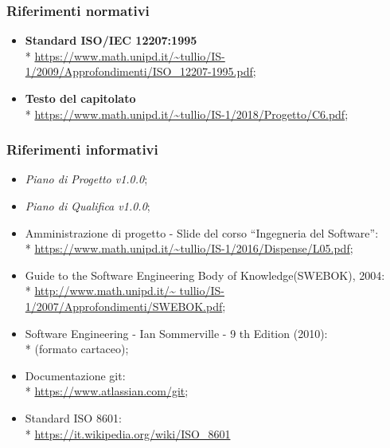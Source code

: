 \subsubsection{Riferimenti normativi}
\begin{itemize}
	\item \textbf{Standard ISO/IEC 12207:1995} \\* 
		\url{https://www.math.unipd.it/~tullio/IS-1/2009/Approfondimenti/ISO_12207-1995.pdf};
	\item \textbf{Testo del capitolato} \\*  
		\url{https://www.math.unipd.it/~tullio/IS-1/2018/Progetto/C6.pdf};
\end{itemize}

\subsubsection{Riferimenti informativi}
\begin{itemize}
	\item \textit{Piano di Progetto v1.0.0};
	\item \textit{Piano di Qualifica v1.0.0};
	\item Amministrazione di progetto - Slide del corso “Ingegneria del
		Software”: \\*
		\url{https://www.math.unipd.it/~tullio/IS-1/2016/Dispense/L05.pdf};
	\item Guide to the Software Engineering Body of Knowledge(SWEBOK), 2004: \\*
		\url{http://www.math.unipd.it/~	tullio/IS-1/2007/Approfondimenti/SWEBOK.pdf};
	\item Software Engineering - Ian Sommerville - 9 th Edition (2010): \\*
		(formato cartaceo);
	\item Documentazione git: \\*
		\url{https://www.atlassian.com/git};
	\item Standard ISO 8601: \\*
		\url{https://it.wikipedia.org/wiki/ISO_8601}
\end{itemize}
